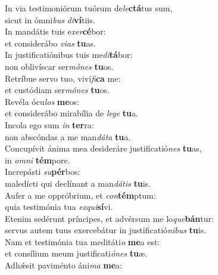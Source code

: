 \evenverse In via testimoniórum tuórum de\textit{le}\textbf{ctá}tus sum,~\*\\
\evenverse sicut in ómni\textit{bus} \textit{di}\textbf{ví}tiis.\\
\oddverse In mandátis tuis e\textit{xer}\textbf{cé}bor:~\*\\
\oddverse et considerábo \textit{vi}\textit{as} \textbf{tu}as.\\
\evenverse In justificatiónibus tuis me\textit{di}\textbf{tá}bor:~\*\\
\evenverse non oblivíscar ser\textit{mó}\textit{nes} \textbf{tu}os.\\
\oddverse Retríbue servo tuo, viví\textit{fi}\textbf{ca} me:~\*\\
\oddverse et custódiam ser\textit{mó}\textit{nes} \textbf{tu}os.\\
\evenverse Revéla ócu\textit{los} \textbf{me}os:~\*\\
\evenverse et considerábo mirabília de \textit{le}\textit{ge} \textbf{tu}a.\\
\oddverse Incola ego sum \textit{in} \textbf{ter}ra:~\*\\
\oddverse non abscóndas a me man\textit{dá}\textit{ta} \textbf{tu}a.\\
\evenverse Concupívit ánima mea desideráre justificatió\textit{nes} \textbf{tu}as,~\*\\
\evenverse in \textit{om}\textit{ni} \textbf{tém}pore.\\
\oddverse Increpásti \textit{su}\textbf{pér}bos:~\*\\
\oddverse maledícti qui declínant a man\textit{dá}\textit{tis} \textbf{tu}is.\\
\evenverse Aufer a me oppróbrium, et \textit{con}\textbf{tém}ptum:~\*\\
\evenverse quia testimónia tua \textit{ex}\textit{qui}\textbf{sí}vi.\\
\oddverse Etenim sedérunt príncipes, et advérsum me lo\textit{que}\textbf{bán}tur:~\*\\
\oddverse servus autem tuus exercebátur in justificatió\textit{ni}\textit{bus} \textbf{tu}is.\\
\evenverse Nam et testimónia tua meditáti\textit{o} \textbf{me}a est:~\*\\
\evenverse et consílium meum justificati\textit{ó}\textit{nes} \textbf{tu}æ.\\
\oddverse Adhǽsit paviménto áni\textit{ma} \textbf{me}a:~\*\\
